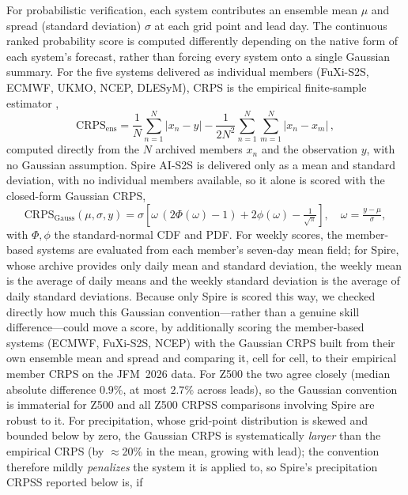 \documentclass[11pt,a4paper]{article}
\begin{document}
For probabilistic verification, each system contributes an ensemble mean
$\mu$ and spread (standard deviation) $\sigma$ at each grid point and lead
day. The continuous ranked probability score \citep[CRPS;][]{gneiting2007} is
computed differently
depending on the native form of each system's forecast, rather than forcing
every system onto a single Gaussian summary. For the five systems delivered
as individual members (FuXi-S2S, ECMWF, UKMO, NCEP, DLESyM), CRPS is the
empirical finite-sample estimator \citep{hersbach2000},
\begin{equation}
  \mathrm{CRPS}_{\mathrm{ens}} = \frac{1}{N}\sum_{n=1}^{N}\bigl|x_n - y\bigr|
  - \frac{1}{2N^{2}}\sum_{n=1}^{N}\sum_{m=1}^{N}\bigl|x_n - x_m\bigr|\,,
  \label{eq:crps_ens}
\end{equation}
computed directly from the $N$ archived members $x_n$ and the observation
$y$, with no Gaussian assumption. Spire AI-S2S is delivered only as a mean
and standard deviation, with no individual members available, so it alone is
scored with the closed-form Gaussian CRPS,
\begin{equation}
  \mathrm{CRPS}_{\mathrm{Gauss}}(\mu,\sigma,y) = \sigma\!\left[\omega\,(2\Phi(\omega)-1)
  + 2\phi(\omega) - \tfrac{1}{\sqrt{\pi}}\right],\quad \omega=\tfrac{y-\mu}{\sigma},
  \label{eq:crps}
\end{equation}
with $\Phi,\phi$ the standard-normal CDF and PDF. For weekly scores, the
member-based systems are evaluated from each member's seven-day mean field; for
Spire, whose archive provides only daily mean and standard deviation, the weekly
mean is the average of daily means and the weekly standard deviation is the
average of daily standard deviations. Because only Spire is scored
this way, we checked directly how much this Gaussian convention---rather than a
genuine skill difference---could move a score, by additionally scoring the
member-based systems (ECMWF, FuXi-S2S, NCEP) with the Gaussian CRPS built from
their own ensemble mean and spread and comparing it, cell for cell, to their
empirical member CRPS on the JFM~2026 data. For Z500 the two agree closely
(median absolute difference $0.9\%$, at most $2.7\%$ across leads), so the
Gaussian convention is immaterial for Z500 and all Z500 CRPSS comparisons
involving Spire are robust to it. For precipitation, whose grid-point
distribution is skewed and bounded below by zero, the Gaussian CRPS is
systematically \emph{larger} than the empirical CRPS (by $\approx$20\% in the
mean, growing with lead); the convention therefore mildly \emph{penalizes} the
system it is applied to, so Spire's precipitation CRPSS reported below is, if
\end{document}
